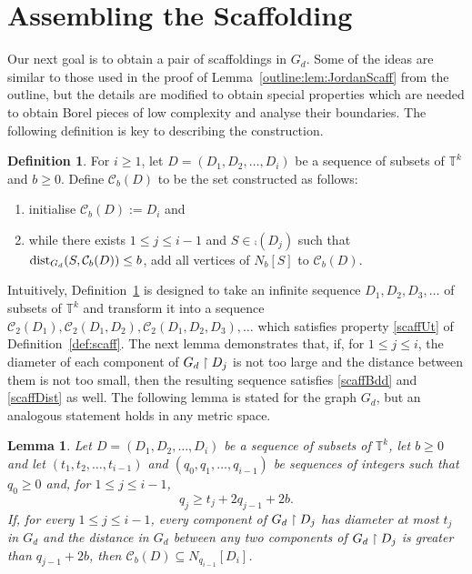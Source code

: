 \documentclass[12pt,a4paper]{amsart}
\numberwithin{equation}{section}
\newtheorem{lemma}[equation]{Lemma}
\theoremstyle{definition}
\newtheorem{defn}[equation]{Definition}
\begin{document}
\section{Assembling the Scaffolding}
\label{sec:covering}

Our next goal is to obtain a pair of scaffoldings in $G_d$. Some of the ideas are similar to those used in the proof of Lemma~\ref{outline:lem:JordanScaff} from the outline, but the details are modified to obtain special properties which are needed to obtain Borel pieces of low complexity and analyse their boundaries. The following definition is key to describing the construction. 



\begin{defn}
\label{def:closure}
For $i\geq1$, let $D=(D_1,D_2,\dots,D_i)$ be a sequence of subsets of $\mathbb{T}^k$ and $b\geq0$. Define $\mathcal{C}_b(D)$ to be the set constructed as follows:
\begin{enumerate}
\item initialise $\mathcal{C}_b(D):=D_i$ and
\item while there exists $1\leq j\leq i-1$ and $S\in\comp(D_{j})$ such that $\operatorname{dist}_{G_d}(S,\mathcal{C}_b(D))\leq b$, add all vertices of $N_b[S]$ to $\mathcal{C}_b(D)$.
\end{enumerate}
\end{defn}

Intuitively, Definition~\ref{def:closure} is designed to take an infinite sequence $D_1,D_2,D_3,\dots$ of subsets of $\mathbb{T}^k$ and transform it into a sequence $\mathcal{C}_2(D_1),\mathcal{C}_2(D_1,D_2),\mathcal{C}_2(D_1,D_2,D_3),\dots$ which satisfies property \eqref{scaffUt} of Definition~\ref{def:scaff}. The next lemma demonstrates that, if, for $1\leq j\leq i$, the diameter of each component of $G_d\upharpoonright D_j$ is not too large and the distance between them is not too small, then the resulting sequence satisfies \eqref{scaffBdd} and \eqref{scaffDist} as well. The following lemma is stated for the graph $G_d$, but an analogous statement holds in any metric space.



\begin{lemma}
\label{lem:chain}
Let $D=(D_1,D_2,\dots,D_i)$ be a sequence of subsets of $\mathbb{T}^k$, let $b\geq0$ and let $(t_1,t_2,\dots,t_{i-1})$ and $(q_0,q_1,\dots,q_{i-1})$ be sequences of integers such that $q_0\geq 0$ and, for $1\leq j\leq i-1$, 
\[q_j\geq t_{j}+2q_{j-1}+2b.\]
If, for every $1\leq j\leq i-1$, every component of $G_d\upharpoonright D_j$ has diameter at most $t_j$ in $G_d$ and the distance in $G_d$ between any two components of $G_d\upharpoonright D_j$ is greater than $q_{j-1}+2b$, then $\mathcal{C}_b(D)\subseteq N_{q_{i-1}}[D_i]$. 
\end{lemma}
\end{document}
